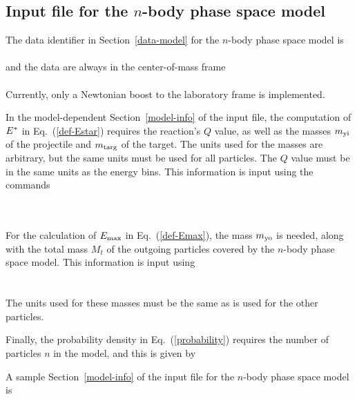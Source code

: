 \subsection{Input file for the $n$-body phase space model}
The data identifier in Section~\ref{data-model} for the
$n$-body phase space model is\\
  \\
and the data are always in the center-of-mass frame\\
  \\
Currently, only a Newtonian boost to the laboratory frame is
implemented.

In the model-dependent Section~\ref{model-info} of the input file,
the computation of ${E^*}$ in Eq.~(\ref{def-Estar}) requires the
reaction's $Q$ value, as well as the masses $m_{\text{yi}}$ of the projectile
and $m_{\text{targ}}$ of the target.  The units used for the masses are arbitrary,
but the same units must be used for all particles.  The $Q$ value must be
in the same units as the energy bins.  This information is input using
the commands\\
  \\
   \\
 
For the calculation of $E_{\text{max}}$ in Eq.~(\ref{def-Emax}), the mass $m_{\text{yo}}$
is needed, along with the total mass $M_t$ of the outgoing particles covered
by the $n$-body phase space model.  This information is input using\\
  \\
 \\
The units used for these masses must be the
same as is used for the other particles.

Finally, the probability density in Eq.~(\ref{probability}) requires the number
of particles $n$ in the model, and this is given by\\
 
A sample Section~\ref{model-info} of the input file for the
$n$-body phase space model is\\
 \\
 \\
 \\
 \\
 \\
 \\


